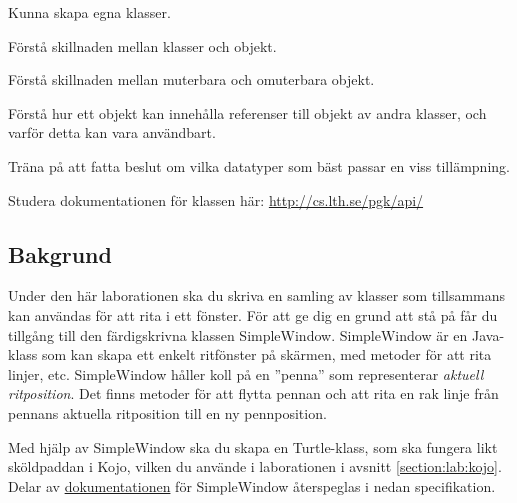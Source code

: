 

\Lab{\LabWeekSIX}

\begin{Goals}
\item Kunna skapa egna klasser.
\item Förstå skillnaden mellan klasser och objekt.
\item Förstå skillnaden mellan muterbara och omuterbara objekt.
\item Förstå hur ett objekt kan innehålla referenser till objekt av andra klasser, och varför detta kan vara användbart.
\item Träna på att fatta beslut om vilka datatyper som bäst passar en viss tillämpning.
\end{Goals}

\begin{Preparations}
\item {}

\item Studera dokumentationen för klassen  här: \url{http://cs.lth.se/pgk/api/}


\end{Preparations}

\subsection{Bakgrund}

Under den här laborationen ska du skriva en samling av klasser som tillsammans kan användas för att rita i ett fönster. För att ge dig en grund att stå på får du tillgång till den färdigskrivna klassen SimpleWindow. SimpleWindow är en Java-klass som kan skapa ett enkelt ritfönster på skärmen, med metoder för att rita linjer, etc. SimpleWindow håller koll på en ''penna'' som representerar \textit{aktuell ritposition}. Det finns metoder för att flytta pennan och att rita en rak linje från pennans aktuella ritposition till en ny pennposition.

Med hjälp av SimpleWindow ska du skapa en Turtle-klass, som ska fungera likt sköldpaddan i Kojo, vilken du använde i laborationen i avsnitt \ref{section:lab:kojo}. Delar av \href{http://cs.lth.se/pgk/api/}{dokumentationen} för SimpleWindow återspeglas i nedan specifikation.

